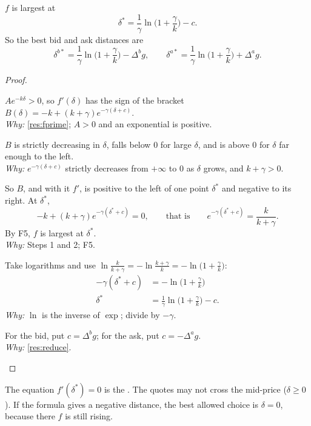 \begin{result}
\label{res:foc}
$f$ is largest at
\[
  \delta^*=\frac1\gamma\ln\!\Big(1+\frac\gamma k\Big)-c .
\]
So the best bid and ask distances are
\[
  \delta^{b*}=\frac1\gamma\ln\!\Big(1+\frac\gamma k\Big)-\Delta^bg,\qquad
  \delta^{a*}=\frac1\gamma\ln\!\Big(1+\frac\gamma k\Big)+\Delta^ag.
\]
\end{result}

\begin{proof}
\begin{steps}
  \item $Ae^{-k\delta}>0$, so $f'(\delta)$ has the sign of the bracket $B(\delta)=-k+(k+\gamma)e^{-\gamma(\delta+c)}$.
  \\ \emph{Why:} \cref{res:fprime}; $A>0$ and an exponential is positive.
  \item $B$ is strictly decreasing in $\delta$, falls below $0$ for large $\delta$, and is above $0$ for $\delta$ far enough to the left.
  \\ \emph{Why:} $e^{-\gamma(\delta+c)}$ strictly decreases from $+\infty$ to $0$ as $\delta$ grows, and $k+\gamma>0$.
  \item So $B$, and with it $f'$, is positive to the left of one point $\delta^*$ and negative to its right. At $\delta^*$,
  \[
    -k+(k+\gamma)e^{-\gamma(\delta^*+c)}=0,\qquad\text{that is}\qquad e^{-\gamma(\delta^*+c)}=\frac{k}{k+\gamma}.
  \]
  By F5, $f$ is largest at $\delta^*$.
  \\ \emph{Why:} Steps 1 and 2; F5.
  \item Take logarithms and use $\ln\frac{k}{k+\gamma}=-\ln\frac{k+\gamma}{k}=-\ln\!\big(1+\frac\gamma k\big)$:
  \[
    \begin{aligned}
      -\gamma(\delta^*+c)&=-\ln\!\Big(1+\frac\gamma k\Big)\\
      \delta^*&=\frac1\gamma\ln\!\Big(1+\frac\gamma k\Big)-c.
    \end{aligned}
  \]
  \emph{Why:} $\ln$ is the inverse of $\exp$; divide by $-\gamma$.
  \item For the bid, put $c=\Delta^bg$; for the ask, put $c=-\Delta^ag$.
  \\ \emph{Why:} \cref{res:reduce}.
\end{steps}
\end{proof}

The equation $f'(\delta^*)=0$ is the . The quotes may not cross the mid-price ($\delta\ge0$). If the formula gives a negative distance, the best allowed choice is $\delta=0$, because there $f$ is still rising.

